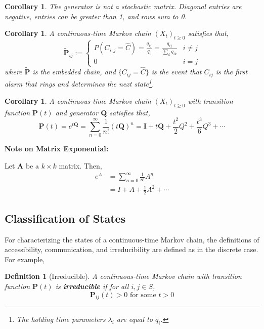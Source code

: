 \documentclass{tufte-handout}
\newtheorem{cor}[thm]{Corollary}
\newtheorem{defn}[thm]{Definition}
\begin{document}
\begin{cor}
  The generator is not a stochastic matrix. Diagonal entries are negative, entries can be greater than 1, and rows sum to 0.
\end{cor}

\begin{cor}
  A continuous-time Markov chain $(X_t)_{t \geq 0}$ satisfies that,
   \[
    \tilde{\boldsymbol{P}}_{i j} := \begin{cases}
    P\left(C_{i, j}=\hat{C}\right)=\frac{q_{i j}}{q_{i}}=\frac{q_{i j}}{\sum_{k} q_{ik}} & i \neq j \\
    0 & i = j
  \end{cases}
  \]
  \noindent where $\tilde{\boldsymbol{P}}$ is the embedded chain, and $\{C_{ij} = \hat{C}\}$ is the event that $C_{ij}$ is the first alarm that rings and determines the next state\footnote{The holding time parameters $\lambda_i$ are equal to $q_i$.}.
\end{cor}

\begin{cor}
  A continuous-time Markov chain $(X_t)_{t \geq 0}$ with transition function $\mathbf{P}(t)$ and generator $\mathbf{Q}$ satisfies that,
  \[\boldsymbol{P}(t)=e^{t \boldsymbol{Q}}=\sum_{n=0}^{\infty} \frac{1}{n !}(t \boldsymbol{Q})^{n}=\boldsymbol{I}+t \boldsymbol{Q}+\frac{t^{2}}{2} Q^{2}+\frac{t^{3}}{6} Q^{3}+\cdots\]
\end{cor}

\begin{marginfigure}
  \textbf{Note on Matrix Exponential:}

  \noindent Let $\mathbf{A}$ be a $k \times k$ matrix. Then, 
  \begin{align*}
    e^{A}&=\sum_{n=0}^{\infty} \frac{1}{n !} A^{n} \\
         &=I+A+\frac{1}{2} A^{2}+\cdots
  \end{align*}
\end{marginfigure}

\subsection{Classification of States}
For characterizing the states of a continuous-time Markov chain, the definitions of accessibility, communication, and irreducibility are defined as in the discrete case. For example,

\begin{defn}[Irreducible]
  A continuous-time Markov chain with transition function $\mathbf{P}(t)$ is \textbf{irreducible} if for all $i, j \in S$, 
  \[\mathbf{P}_{ij}(t) > 0 \text{ for some $t > 0$}\]
\end{defn}
\end{document}
